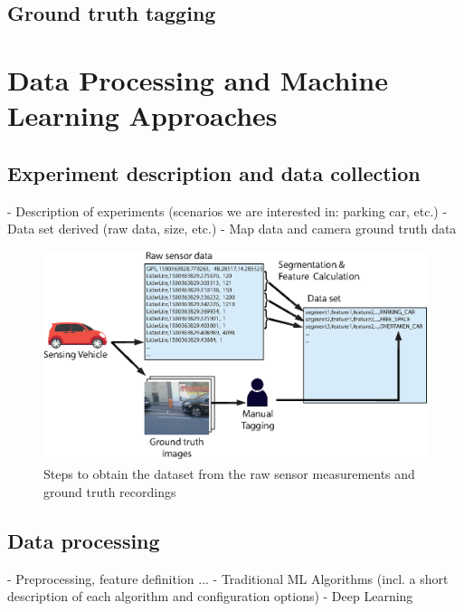 \section{Ground truth tagging}












\chapter{Data Processing and Machine Learning Approaches}

\section{Experiment description and data collection}
\label{sec:experiment_description_data_collection}
- Description of experiments (scenarios we are interested in: parking car, etc.)
- Data set derived (raw data, size, etc.)
- Map data and camera ground truth data

\begin{figure}
	\centering
	\includegraphics[width=\textwidth]{img/obtaining-dataset-architecture.eps}
	\caption{Steps to obtain the dataset from the raw sensor measurements and ground truth recordings}
	\label{fig:dataset_architecture}
\end{figure}

\section{Data processing}
\label{sec:data_processing}
- Preprocessing, feature definition ...
- Traditional ML Algorithms (incl. a short description of each algorithm and configuration options)
- Deep Learning